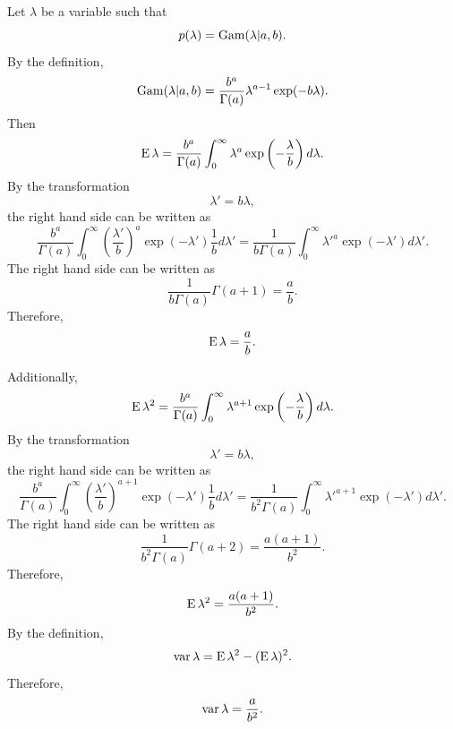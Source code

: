 \subsection{}
\label{2.42}
Let $\lambda$ be a variable such that
%
\begin{equation}
p(\lambda)
=
{\rm Gam} (\lambda | a, b).
\end{equation}
%
By the definition,
%
\begin{equation}
{\rm Gam} (\lambda | a, b)
=
\frac{b ^ a}{\Gamma(a)} 
\lambda ^ {a - 1}
\exp (- b \lambda).
\end{equation}
%
Then
%
\begin{equation}
\operatorname{E} \lambda
=
\frac{b ^ a}{\Gamma(a)}
\int_{0}^{\infty}
\lambda ^ a
\exp
\left(
	-
	\frac{\lambda}{b}
\right)
d\lambda.
\end{equation}
%
By the transformation
%
\begin{equation}
\lambda'
= 
b \lambda,
\end{equation}
%
the right hand side can be written as
%
\begin{equation}
\frac{b ^ a}{\Gamma(a)} 
\int_{0}^{\infty}
\left(
	\frac{\lambda'}{b}
\right) ^ a
\exp (- \lambda')
\frac{1}{b}
d\lambda'
=
\frac{1}{b \Gamma(a)}
\int_{0}^{\infty}
{\lambda'} ^ a
\exp (- \lambda')
d\lambda'.
\end{equation}
%
The right hand side can be written as
%
\begin{equation}
\frac{1}{b \Gamma(a)}
\Gamma(a + 1)
=
\frac{a}{b}.
\end{equation}
%
Therefore,
%
\begin{equation}
\operatorname{E} \lambda
=
\frac{a}{b}.
\end{equation}
%

Additionally,
%
\begin{equation}
\operatorname{E} \lambda ^ 2
=
\frac{b ^ a}{\Gamma(a)}
\int_{0}^{\infty}
\lambda ^ {a + 1}
\exp
\left(
	-
	\frac{\lambda}{b}
\right)
d\lambda.
\end{equation}
%
By the transformation
%
\begin{equation}
\lambda'
= 
b \lambda,
\end{equation}
%
the right hand side can be written as
%
\begin{equation}
\frac{b ^ a}{\Gamma(a)} 
\int_{0}^{\infty}
\left(
	\frac{\lambda'}{b}
\right) ^ {a + 1}
\exp (- \lambda')
\frac{1}{b}
d\lambda'
=
\frac{1}{b ^ 2 \Gamma(a)}
\int_{0}^{\infty}
{\lambda'} ^ {a + 1}
\exp (- \lambda')
d\lambda'.
\end{equation}
%
The right hand side can be written as
%
\begin{equation}
\frac{1}{b ^ 2 \Gamma(a)}
\Gamma(a + 2)
=
\frac{a (a + 1)}{b ^ 2}.
\end{equation}
%
Therefore,
%
\begin{equation}
\operatorname{E} \lambda ^ 2
=
\frac{a (a + 1)}{b ^ 2}.
\end{equation}
%
By the definition,
%
\begin{equation}
\operatorname{var} \lambda
=
\operatorname{E} \lambda ^ 2
-
(\operatorname{E} \lambda) ^ 2.
\end{equation}
%
Therefore,
%
\begin{equation}
\operatorname{var} \lambda
=
\frac{a}{b ^ 2}.
\end{equation}
%

